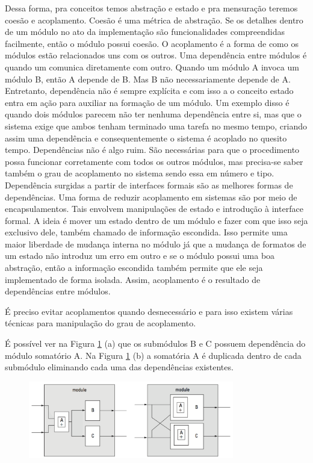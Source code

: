 Dessa forma, pra conceitos temos abstração e estado e pra mensuração teremos coesão e acoplamento. Coesão é uma métrica de abstração. Se os detalhes dentro de um módulo no ato da implementação são funcionalidades compreendidas facilmente, então o módulo possui coesão. O acoplamento é a forma de como os módulos estão relacionados uns com os outros. Uma dependência entre módulos é quando um comunica diretamente com outro. Quando um módulo A invoca um módulo B, então A depende de B. Mas B não necessariamente depende de A. Entretanto, dependência não é sempre explícita e com isso a o conceito estado entra em ação para auxiliar na formação de um módulo. Um exemplo disso é quando dois módulos parecem não ter nenhuma dependência entre si, mas que o sistema exige que ambos tenham terminado uma tarefa no mesmo tempo, criando assim uma dependência e consequentemente o sistema é acoplado no quesito tempo. Dependências não é algo ruim. São necessárias para que o procedimento possa funcionar corretamente com todos os outros módulos, mas precisa-se saber também o grau de acoplamento no sistema sendo essa em número e tipo. Dependência surgidas a partir de interfaces formais são as melhores formas de dependências. Uma forma de reduzir acoplamento em sistemas são por meio de encapsulamentos. Tais envolvem manipulações de estado e introdução à interface formal. A ideia é mover um estado dentro de um módulo e fazer com que isso seja exclusivo dele, também chamado de informação escondida. Isso permite uma maior liberdade de mudança interna no módulo já que a mudança de formatos de um estado não introduz um erro em outro e se o módulo possui uma boa abstração, então a informação escondida também permite que ele seja implementado de forma isolada. Assim, acoplamento é o resultado de dependências entre módulos.

É preciso evitar acoplamentos quando desnecessário e para isso existem várias técnicas para manipulação do grau de acoplamento.

É possível ver na Figura \ref{fig:f3-4} (a) que os submódulos B e C possuem dependência do módulo somatório A. Na Figura \ref{fig:f3-4} (b) a somatória A é duplicada dentro de cada submódulo eliminando cada uma das dependências existentes.

\begin{figure}[h] \centering
	\includegraphics[width=0.8\textwidth]{img/f3-4.png}
	\caption{}
	\label{fig:f3-4}
\end{figure}

